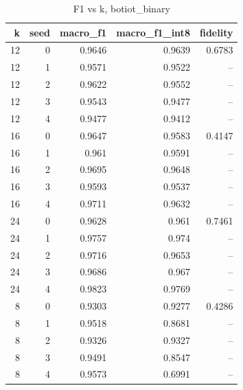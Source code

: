 \begin{table}
\caption{F1 vs k, botiot_binary}
\begin{tabular}{rrrrr}
\toprule
k & seed & macro_f1 & macro_f1_int8 & fidelity \\
\midrule
12 & 0 & 0.9646 & 0.9639 & 0.6783 \\
12 & 1 & 0.9571 & 0.9522 & -- \\
12 & 2 & 0.9622 & 0.9552 & -- \\
12 & 3 & 0.9543 & 0.9477 & -- \\
12 & 4 & 0.9477 & 0.9412 & -- \\
16 & 0 & 0.9647 & 0.9583 & 0.4147 \\
16 & 1 & 0.961 & 0.9591 & -- \\
16 & 2 & 0.9695 & 0.9648 & -- \\
16 & 3 & 0.9593 & 0.9537 & -- \\
16 & 4 & 0.9711 & 0.9632 & -- \\
24 & 0 & 0.9628 & 0.961 & 0.7461 \\
24 & 1 & 0.9757 & 0.974 & -- \\
24 & 2 & 0.9716 & 0.9653 & -- \\
24 & 3 & 0.9686 & 0.967 & -- \\
24 & 4 & 0.9823 & 0.9769 & -- \\
8 & 0 & 0.9303 & 0.9277 & 0.4286 \\
8 & 1 & 0.9518 & 0.8681 & -- \\
8 & 2 & 0.9326 & 0.9327 & -- \\
8 & 3 & 0.9491 & 0.8547 & -- \\
8 & 4 & 0.9573 & 0.6991 & -- \\
\bottomrule
\end{tabular}
\end{table}
